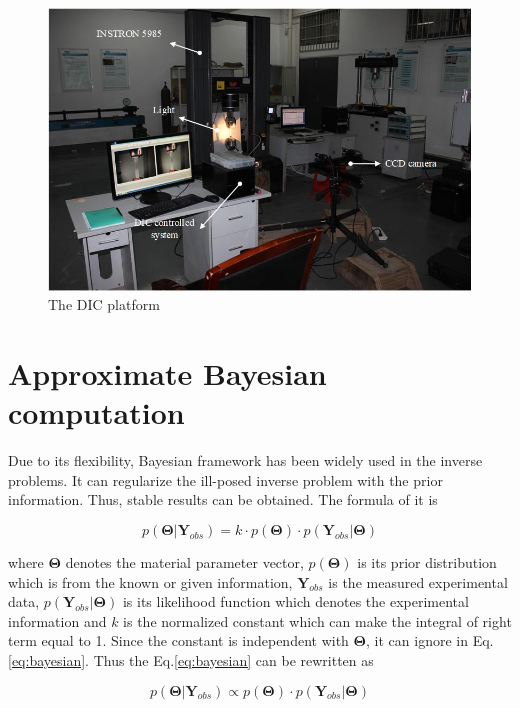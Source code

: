 \documentclass[review]{elsarticle}
\begin{document}
\begin{figure}[h!]
\centering
\includegraphics[width=1\textwidth]{./figs/DIC.jpg}
\caption{The DIC platform}
\label{fig:DICplatform}
\end{figure}

\section{Approximate Bayesian computation}

Due to its flexibility, Bayesian framework has been widely used in the inverse problems. It can regularize the ill-posed inverse problem with the prior information. Thus, stable results can be obtained. The formula of it is

\begin{equation}
\label{eq:bayesian}
p(\mathbf{\Theta} | \mathbf{Y}_{obs}) = k \cdot p(\mathbf{\Theta}) \cdot p( \mathbf{Y}_{obs} | \mathbf{\Theta} )
\end{equation}

\noindent where $\mathbf{\Theta}$ denotes the material parameter vector, $p(\mathbf{\Theta})$ is its prior distribution which is from the known or given information, $\mathbf{Y}_{obs}$ is the measured experimental data,  $p(\mathbf{Y}_{obs}|\mathbf{\Theta})$ is its likelihood function which denotes the experimental information and $k$ is the normalized constant which can make the integral of right term equal to 1. Since the constant is independent with $\mathbf{\Theta}$, it can ignore in Eq.\ref{eq:bayesian}. Thus the Eq.\ref{eq:bayesian} can be rewritten as 

\begin{equation}
\label{eq.bayesianratiao}
p(\mathbf{\Theta} | \mathbf{Y}_{obs}) \propto p(\mathbf{\Theta}) \cdot p( \mathbf{Y}_{obs} | \mathbf{\Theta})
\end{equation}
\end{document}
